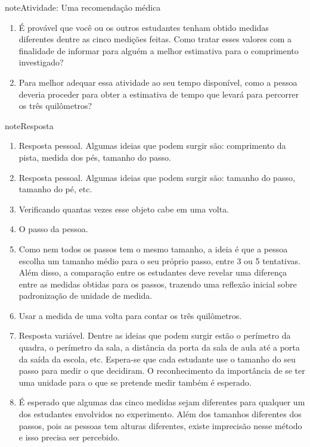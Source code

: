 \begin{sphinxadmonition}{note}{Atividade: Uma recomendação médica}
\begin{enumerate}
\item {} 
É provável que você ou os outros estudantes tenham obtido medidas diferentes dentre as cinco medições feitas. Como tratar esses valores com a finalidade de informar para alguém a melhor estimativa para o comprimento investigado?

\item {} 
Para melhor adequar essa atividade ao seu tempo disponível, como a pessoa deveria proceder para obter a estimativa de tempo que levará para percorrer os três quilômetros?

\end{enumerate}
\end{sphinxadmonition}

\begin{sphinxadmonition}{note}{Resposta}
\begin{enumerate}
\item {} 
Resposta pessoal. Algumas ideias que podem surgir são: comprimento da pista, medida dos pés, tamanho do passo.

\item {} 
Resposta pessoal. Algumas ideias que podem surgir são: tamanho do passo, tamanho do pé, etc.

\item {} 
Verificando quantas vezes esse objeto cabe em uma volta.

\item {} 
O passo da pessoa.

\item {} 
Como nem todos os passos tem o mesmo tamanho, a ideia é que a pessoa escolha um tamanho médio para o seu próprio passo, entre 3 ou 5 tentativas. Além disso, a comparação entre os estudantes deve revelar uma diferença entre as medidas obtidas para os passos, trazendo uma reflexão inicial sobre padronização de unidade de medida.

\item {} 
Usar a medida de uma volta para contar os três quilômetros.

\item {} 
Resposta variável. Dentre as ideias que podem surgir estão o perímetro da quadra, o perímetro da sala, a distância da porta da sala de aula até a porta da saída da escola, etc. Espera-se que cada estudante use o tamanho do seu passo para medir o que decidiram. O reconhecimento da importância de se ter uma unidade para o que se pretende medir também é esperado.

\item {} 
É esperado que algumas das cinco medidas sejam diferentes para qualquer um dos estudantes envolvidos no experimento. Além dos tamanhos diferentes dos passos, pois as pessoas tem alturas diferentes, existe imprecisão nesse método e isso precisa ser percebido.


\end{enumerate}
\end{sphinxadmonition}
